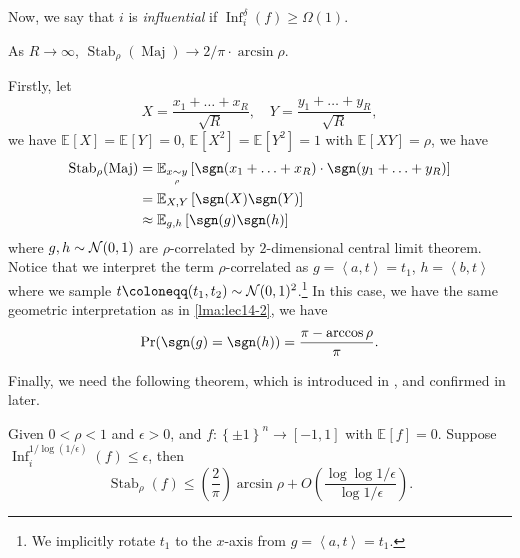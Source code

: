 Now, we say that \(i\) is \emph{influential} if \(\mathop{\mathrm{Inf}}_i^\delta (f) \geq \Omega (1).\)

\begin{claim}
	As \(R \to \infty \), \(\mathop{\mathrm{Stab}}_\rho (\mathop{\mathrm{Maj}}) \to 2 / \pi \cdot \arcsin \rho\).
\end{claim}
\begin{explanation}
	Firstly, let
	\[
		X = \frac{x_1 + \ldots  + x_R}{\sqrt{R} },\quad
		Y = \frac{y_1 + \ldots  + y_R}{\sqrt{R} },
	\]
	we have \(\mathbb{E}_{}\left[X \right] = \mathbb{E}_{}\left[Y \right] = 0\), \(\mathbb{E}_{}\left[X^2 \right] = \mathbb{E}_{}\left[Y^2 \right] = 1\) with \(\mathbb{E}_{}\left[XY \right] = \rho \), we have
	\[
		\begin{split}
			\mathop{\mathrm{Stab}}\nolimits_\rho (\mathop{\mathrm{Maj}})
			&= \mathbb{E}_{x \underset{\rho }{\sim } y}\left[ \sgn (x_1 + \ldots + x_R ) \cdot \sgn (y_1 + \ldots +y_R )\right]\\
			&= \mathbb{E}_{X, Y}\left[\sgn (X) \sgn (Y) \right]\\
			&\approx \mathbb{E}_{g, h}\left[\sgn (g)\sgn (h) \right]
		\end{split}
	\]
	where \(g, h \sim \mathcal{\MakeUppercase{n}} (0, 1)\) are \(\rho \)-correlated by \(2\)-dimensional central limit theorem. Notice that we interpret the term \(\rho \)-correlated as \(g=\left\langle a, t \right\rangle = t_1\), \(h=\left\langle b, t \right\rangle \) where we sample \(t \coloneqq (t_1, t_2)\sim \mathcal{\MakeUppercase{n}} (0, 1)^2\).\footnote{We implicitly rotate \(t_1\) to the \(x\)-axis from \(g=\left\langle a, t \right\rangle = t_1\).} In this case, we have the same geometric interpretation as in \autoref{lma:lec14-2}, we have
	\[
		\Pr_{}(\sgn (g) = \sgn (h)) = \frac{\pi - \arccos \rho }{\pi }.
	\]
\end{explanation}

Finally, we need the following theorem, which is introduced in \cite{1366234}, and confirmed in \cite{https://doi.org/10.48550/arxiv.math/0503503} later.

\begin{theorem}\label{thm:MIST}
	Given \(0 < \rho < 1\) and \(\epsilon > 0\), and \(f\colon \left\{ \pm 1 \right\} ^n \to [-1, 1]\) with \(\mathbb{E}_{}\left[f \right] = 0\). Suppose \(\mathop{\mathrm{Inf}}_i^{1 / \log (1 / \epsilon )}(f)\leq \epsilon \), then
	\[
		\mathop{\mathrm{Stab}}\nolimits_\rho (f) \leq \left( \frac{2}{\pi } \right) \arcsin \rho + O\left( \frac{\log \log 1 / \epsilon }{\log 1 / \epsilon } \right).
	\]
\end{theorem}